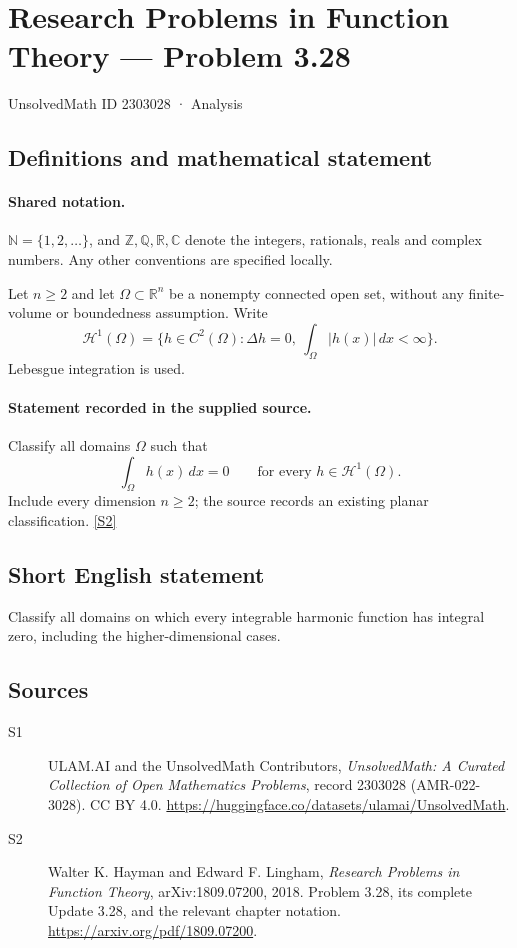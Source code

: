 \documentclass[11pt]{book}
\newcommand{\sref}[2]{\hyperlink{source:#1:#2}{[S#2]}}
\begin{document}
\setcounter{section}{2303027}
\section{Research Problems in Function Theory — Problem 3.28}\label{2303028}
{\small\sffamily UnsolvedMath ID 2303028 · Analysis}
\subsection{Definitions and mathematical statement}

\paragraph{Shared notation.}$\mathbb N=\{1,2,\ldots\}$, and $\mathbb Z,\mathbb Q,\mathbb R,\mathbb C$ denote the integers, rationals, reals and complex numbers. Any other conventions are specified locally.


Let $n\ge2$ and let $\Omega\subset\mathbb R^n$ be a nonempty connected open set, without any finite-volume or boundedness assumption. Write
\[\mathcal H^1(\Omega)=\{h\in C^2(\Omega):\Delta h=0,\ \int_\Omega|h(x)|\,dx<\infty\}.
\]
Lebesgue integration is used.
\paragraph{Statement recorded in the supplied source.}
Classify all domains $\Omega$ such that
\[\int_\Omega h(x)\,dx=0\qquad\text{for every }h\in\mathcal H^1(\Omega).
\]
Include every dimension $n\ge2$; the source records an existing planar classification. \sref{2303028}{2}
\subsection{Short English statement}
Classify all domains on which every integrable harmonic function has integral zero, including the higher-dimensional cases.
\subsection{Sources}
\begin{description}
\item[\hypertarget{source:2303028:1}{S1}] ULAM.AI and the UnsolvedMath Contributors, \emph{UnsolvedMath: A Curated Collection of Open Mathematics Problems}, record 2303028 (AMR-022-3028). CC BY 4.0. \url{https://huggingface.co/datasets/ulamai/UnsolvedMath}.
\item[\hypertarget{source:2303028:2}{S2}] Walter K. Hayman and Edward F. Lingham, \emph{Research Problems in Function Theory}, arXiv:1809.07200, 2018. Problem 3.28, its complete Update 3.28, and the relevant chapter notation. \url{https://arxiv.org/pdf/1809.07200}.
\end{description}
\label{end:2303028}
\end{document}
